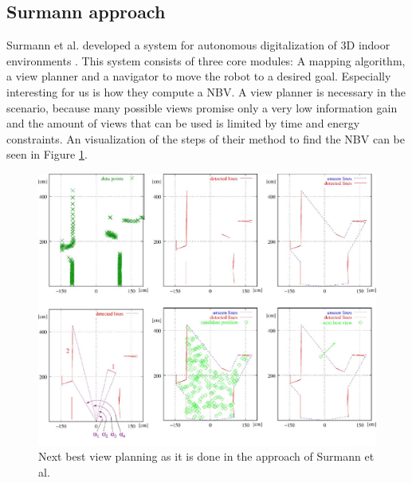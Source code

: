 \documentclass[a4paper,11pt,english]{article}
\begin{document}
\subsection{Surmann approach}
\label{background:surmann}
Surmann et al. developed a system for autonomous digitalization of 3D indoor environments \cite{surmann2003autonomous}.
This system consists of three core modules: A mapping algorithm, a view planner and a navigator to move the robot to a desired goal.
Especially interesting for us is how they compute a NBV.
A view planner is necessary in the  scenario, because many possible views promise only a very low information gain and the amount of views that can be used is limited by time and energy constraints.
An visualization of the steps of their method  to find the NBV can be seen in Figure \ref{fig:surmann}.

\begin{figure}[h!]
	\begin{center}
		\includegraphics[width=1\textwidth]{src/nbv.png}
		\caption{Next best view planning as it is done in the approach of Surmann et al.}
		\label{fig:surmann}
	\end{center}
\end{figure}
\end{document}
